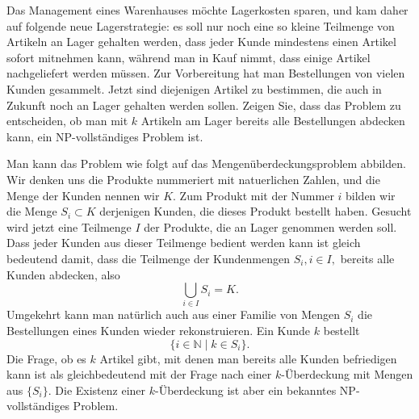 Das Management eines Warenhauses möchte Lagerkosten sparen, und
kam daher auf folgende neue Lagerstrategie: es soll nur noch eine
so kleine Teilmenge von Artikeln an Lager gehalten werden, dass
jeder Kunde mindestens einen Artikel sofort mitnehmen kann, während
man in Kauf nimmt, dass einige Artikel nachgeliefert werden müssen.
Zur Vorbereitung hat man Bestellungen von vielen Kunden gesammelt.
Jetzt sind diejenigen Artikel zu bestimmen, die auch in Zukunft
noch an Lager gehalten werden sollen. Zeigen Sie, dass das Problem
zu entscheiden, ob man mit $k$ Artikeln am Lager bereits alle
Bestellungen abdecken kann, ein NP-vollständiges Problem ist.


\begin{loesung}
Man kann das Problem wie folgt auf das Mengenüberdeckungsproblem
abbilden.
Wir denken uns die Produkte nummeriert mit natuerlichen Zahlen,
und die Menge der Kunden nennen wir $K$.
Zum Produkt mit der Nummer $i$ bilden wir die Menge
$S_i\subset K$ derjenigen Kunden, die dieses Produkt bestellt haben.
Gesucht wird jetzt eine Teilmenge $I$ der Produkte, die an Lager
genommen werden soll. Dass jeder Kunden aus dieser Teilmenge
bedient werden kann ist gleich bedeutend damit, dass die Teilmenge
der Kundenmengen $S_i, i\in I,$ bereits alle Kunden abdecken, also
\[
\bigcup_{i\in I}S_i=K.
\]
Umgekehrt kann man natürlich auch aus einer Familie von Mengen
$S_i$ die Bestellungen eines Kunden wieder rekonstruieren. Ein
Kunde $k$ bestellt
\[
\{i\in \mathbb N\mid k\in S_i\}.
\]
Die Frage, ob es $k$ Artikel gibt, mit denen man bereits alle
Kunden befriedigen kann ist als gleichbedeutend mit der Frage
nach einer $k$-Überdeckung mit Mengen aus $\{S_i\}$. Die
Existenz einer $k$-Überdeckung ist aber ein bekanntes NP-vollständiges
Problem.
\end{loesung}
